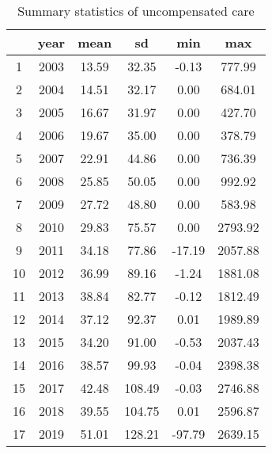 \begin{table}[ht]
\centering
\begin{tabular}{cccccc}
  \hline
 & year & mean & sd & min & max \\ 
  \hline
1 & 2003 & 13.59 & 32.35 & -0.13 & 777.99 \\ 
  2 & 2004 & 14.51 & 32.17 & 0.00 & 684.01 \\ 
  3 & 2005 & 16.67 & 31.97 & 0.00 & 427.70 \\ 
  4 & 2006 & 19.67 & 35.00 & 0.00 & 378.79 \\ 
  5 & 2007 & 22.91 & 44.86 & 0.00 & 736.39 \\ 
  6 & 2008 & 25.85 & 50.05 & 0.00 & 992.92 \\ 
  7 & 2009 & 27.72 & 48.80 & 0.00 & 583.98 \\ 
  8 & 2010 & 29.83 & 75.57 & 0.00 & 2793.92 \\ 
  9 & 2011 & 34.18 & 77.86 & -17.19 & 2057.88 \\ 
  10 & 2012 & 36.99 & 89.16 & -1.24 & 1881.08 \\ 
  11 & 2013 & 38.84 & 82.77 & -0.12 & 1812.49 \\ 
  12 & 2014 & 37.12 & 92.37 & 0.01 & 1989.89 \\ 
  13 & 2015 & 34.20 & 91.00 & -0.53 & 2037.43 \\ 
  14 & 2016 & 38.57 & 99.93 & -0.04 & 2398.38 \\ 
  15 & 2017 & 42.48 & 108.49 & -0.03 & 2746.88 \\ 
  16 & 2018 & 39.55 & 104.75 & 0.01 & 2596.87 \\ 
  17 & 2019 & 51.01 & 128.21 & -97.79 & 2639.15 \\ 
   \hline
\end{tabular}
\caption{Summary statistics of uncompensated care} 
\end{table}
